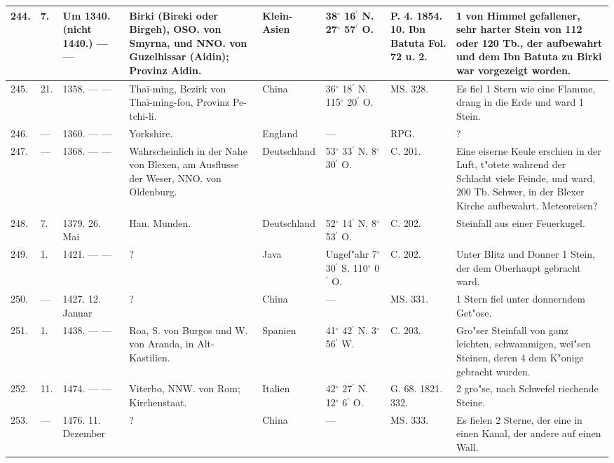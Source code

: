 \documentclass[a4paper, 8pt, oneside, polutonikogreek, german]{article}
\begin{document}
\begin{center}
\begin{longtable}{| p{5mm} | p{3mm} | p{15mm} | p{25mm} | p{20mm} | p{14mm} | p{17mm} | p{24mm} |}
        244. & 7. & Um 1340. (nicht 1440.) --- --- & Birki (Bireki oder Birgeh), OSO. von Smyrna, und NNO. von Guzelhissar (Aidin); Provinz Aidin. & Klein-Asien & 38$^\circ$ 16$^\prime$ N. 27$^\circ$ 57$^\prime$ O. & P. 4. 1854. 10. Ibn Batuta Fol. 72 u. 2. & 1 von Himmel gefallener, sehr harter Stein von 112 oder 120 Tb., der aufbewahrt und dem Ibn Batuta zu Birki war vorgezeigt worden. \\ \hline
        245. & 21. & 1358. --- --- & Thaï-ming, Bezirk von Thaï-ming-fou, Provinz Pe-tchi-li. & China & 36$^\circ$ 18$^\prime$ N. 115$^\circ$ 20$^\prime$ O. & MS. 328. & Es fiel 1 Stern wie eine Flamme, drang in die Erde und ward 1 Stein. \\ \hline
        246. & --- & 1360. --- --- & Yorkshire. & England & --- & RPG. & ? \\ \hline
        247. & --- & 1368. --- --- & Wahrscheinlich in der Nahe von Blexen, am Ausflusse der Weser, NNO. von Oldenburg. & Deutschland & 53$^\circ$ 33$^\prime$ N. 8$^\circ$ 30$^\prime$ O. & C. 201. & Eine eiserne Keule erschien in der Luft, t"otete wahrend der Schlacht viele Feinde, und ward, 200 Tb. Schwer, in der Blexer Kirche aufbewahrt. Meteoreisen? \\ \hline
        248. & 7. & 1379. 26. Mai & Han. Munden. & Deutschland & 52$^\circ$ 14$^\prime$ N. 8$^\circ$ 53$^\prime$ O. & C. 202. & Steinfall aus einer Feuerkugel. \\ \hline
        249. & 1. & 1421. --- --- & ? & Java & Ungef"ahr 7$^\circ$ 30$^\prime$ S. 110$^\circ$ 0$^\prime$ O. & C. 202. & Unter Blitz und Donner 1 Stein, der dem Oberhaupt gebracht ward. \\ \hline
        250. & --- & 1427. 12. Januar & ? & China & --- & MS. 331. & 1 Stern fiel unter donnerndem Get"ose. \\ \hline
        251. & 1. & 1438. --- --- & Roa, S. von Burgos und W. von Aranda, in Alt-Kastilien. & Spanien & 41$^\circ$ 42$^\prime$ N. 3$^\circ$ 56$^\prime$ W. & C. 203. & Gro"ser Steinfall von ganz leichten, schwammigen, wei"sen Steinen, deren 4 dem K"onige gebracht wurden. \\ \hline
        252. & 11. & 1474. --- --- & Viterbo, NNW. von Rom; Kirchenstaat. & Italien & 42$^\circ$ 27$^\prime$ N. 12$^\circ$ 6$^\prime$ O. & G. 68. 1821. 332. & 2 gro"se, nach Schwefel riechende Steine. \\ \hline
        253. & --- & 1476. 11. Dezember & ? & China & --- & MS. 333. & Es fielen 2 Sterne, der eine in einen Kanal, der andere auf einen Wall. \\ \hline

\end{longtable}
\end{center}
\end{document}
